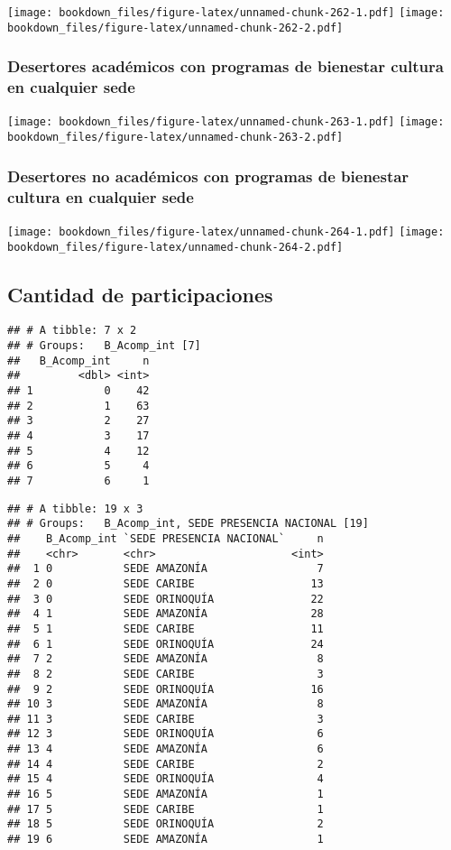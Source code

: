 \documentclass[]{article}
\theoremstyle{definition}
\theoremstyle{definition}
\theoremstyle{definition}
\theoremstyle{remark}
\begin{document}
\texttt{[image: bookdown\_files/figure-latex/unnamed-chunk-262-1.pdf]}
\texttt{[image: bookdown\_files/figure-latex/unnamed-chunk-262-2.pdf]}

\subsubsection{Desertores académicos con programas de bienestar cultura
en cualquier
sede}\label{desertores-academicos-con-programas-de-bienestar-cultura-en-cualquier-sede-1}

\texttt{[image: bookdown\_files/figure-latex/unnamed-chunk-263-1.pdf]}
\texttt{[image: bookdown\_files/figure-latex/unnamed-chunk-263-2.pdf]}

\subsubsection{Desertores no académicos con programas de bienestar
cultura en cualquier
sede}\label{desertores-no-academicos-con-programas-de-bienestar-cultura-en-cualquier-sede-1}

\texttt{[image: bookdown\_files/figure-latex/unnamed-chunk-264-1.pdf]}
\texttt{[image: bookdown\_files/figure-latex/unnamed-chunk-264-2.pdf]}

\subsection{Cantidad de
participaciones}\label{cantidad-de-participaciones-1}

\begin{verbatim}
## # A tibble: 7 x 2
## # Groups:   B_Acomp_int [7]
##   B_Acomp_int     n
##         <dbl> <int>
## 1           0    42
## 2           1    63
## 3           2    27
## 4           3    17
## 5           4    12
## 6           5     4
## 7           6     1
\end{verbatim}

\begin{verbatim}
## # A tibble: 19 x 3
## # Groups:   B_Acomp_int, SEDE PRESENCIA NACIONAL [19]
##    B_Acomp_int `SEDE PRESENCIA NACIONAL`     n
##    <chr>       <chr>                     <int>
##  1 0           SEDE AMAZONÍA                 7
##  2 0           SEDE CARIBE                  13
##  3 0           SEDE ORINOQUÍA               22
##  4 1           SEDE AMAZONÍA                28
##  5 1           SEDE CARIBE                  11
##  6 1           SEDE ORINOQUÍA               24
##  7 2           SEDE AMAZONÍA                 8
##  8 2           SEDE CARIBE                   3
##  9 2           SEDE ORINOQUÍA               16
## 10 3           SEDE AMAZONÍA                 8
## 11 3           SEDE CARIBE                   3
## 12 3           SEDE ORINOQUÍA                6
## 13 4           SEDE AMAZONÍA                 6
## 14 4           SEDE CARIBE                   2
## 15 4           SEDE ORINOQUÍA                4
## 16 5           SEDE AMAZONÍA                 1
## 17 5           SEDE CARIBE                   1
## 18 5           SEDE ORINOQUÍA                2
## 19 6           SEDE AMAZONÍA                 1
\end{verbatim}
\end{document}
